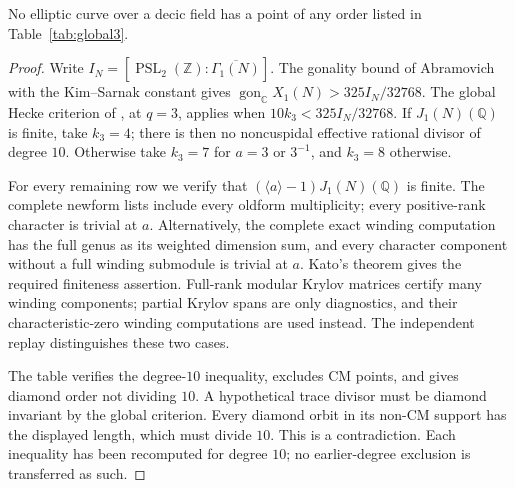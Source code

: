 \begin{proposition}\label{prop:global3}
No elliptic curve over a decic field has a point of any order listed
in Table~\ref{tab:global3}.
\end{proposition}
\begin{proof}
Write $I_N=[\operatorname{PSL}_2(\mathbb Z):\overline{\Gamma_1(N)}]$.
The gonality bound of Abramovich with the Kim--Sarnak constant gives
$\operatorname{gon}_{\mathbb C}X_1(N)>325I_N/32768$.
The global Hecke criterion of \cite[Proposition~4.4]{DN}, at $q=3$,
applies when $10k_3<325I_N/32768$.
If $J_1(N)(\mathbb Q)$ is finite, take $k_3=4$; there is then no
noncuspidal effective rational divisor of degree $10$.
Otherwise take $k_3=7$ for $a=3$ or $3^{-1}$, and $k_3=8$ otherwise.

For every remaining row we verify that
$(\langle a\rangle-1)J_1(N)(\mathbb Q)$ is finite.
The complete newform lists include every oldform multiplicity;
every positive-rank character is trivial at $a$.
Alternatively, the complete exact winding computation has the full
genus as its weighted dimension sum, and every character component
without a full winding submodule is trivial at $a$.
Kato's theorem gives the required finiteness assertion.
Full-rank modular Krylov matrices certify many winding components;
partial Krylov spans are only diagnostics, and their characteristic-zero
winding computations are used instead. The independent replay distinguishes
these two cases.

The table verifies the degree-$10$ inequality, excludes CM points,
and gives diamond order not dividing $10$. A hypothetical trace divisor
must be diamond invariant by the global criterion. Every diamond orbit
in its non-CM support has the displayed length, which must divide $10$.
This is a contradiction. Each inequality has been recomputed for degree
$10$; no earlier-degree exclusion is transferred as such.
\end{proof}
